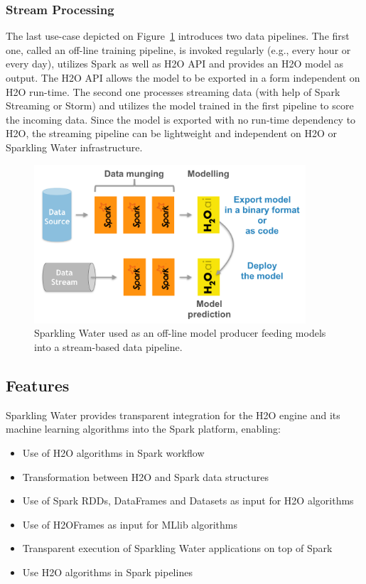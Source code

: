 \documentclass{standalone}
\begin{document}
\subsubsection{Stream Processing}
The last use-case depicted on Figure~\ref{fig:uc3} introduces two data pipelines. The first one, called an off-line training pipeline, is invoked regularly (e.g., every hour or every day), utilizes Spark as well as H2O API and provides an H2O model as output. The H2O API allows the model to be exported in a form independent on H2O run-time. The second one processes streaming data (with help of Spark Streaming or Storm) and utilizes the model trained in the first pipeline to score the incoming data. Since the model is exported with no run-time dependency to H2O, the streaming pipeline can be lightweight and independent on H2O or Sparkling Water infrastructure.

\begin{figure}[h]
	\centering
	\includegraphics[width=0.9\textwidth]{../images/uc3.png}
	\caption{Sparkling Water used as an off-line model producer feeding models into a stream-based data pipeline.}
	\label{fig:uc3} 
\end{figure}

\subsection{Features}

Sparkling Water provides transparent integration for the H2O engine and its machine learning algorithms into the Spark platform, enabling:

\begin{itemize}

 \item Use of H2O algorithms in Spark workflow
 \item Transformation between H2O and Spark data structures
 \item Use of Spark RDDs, DataFrames and Datasets as input for H2O algorithms
 \item Use of H2OFrames as input for MLlib algorithms
 \item Transparent execution of Sparkling Water applications on top of Spark
 \item Use H2O algorithms in Spark pipelines
\end{itemize}
\end{document}
